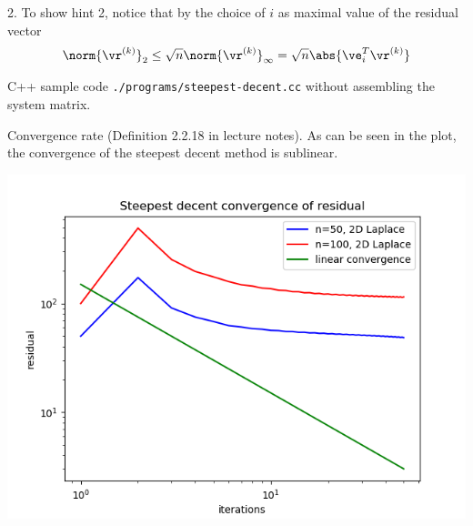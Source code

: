 \begin{SolutionSheet}[\ref{sheet8}]
\begin{Solution}
    2. To show hint 2, notice that by the choice of $i$ as maximal
    value of the residual vector
    \begin{align*}
      \norm{\vr^{(k)}}_2
      \leq \sqrt{n} \norm{\vr^{(k)}}_{\infty}
      = \sqrt{n} \abs{\ve_i^T\vr^{(k)}}
    \end{align*}

  \end{Solution}

  \begin{Solution}
  \end{Solution}

  \begin{Solution}[Programming]
    C++ sample code \lstinline{./programs/steepest-decent.cc} without
    assembling the system matrix.

    Convergence rate (Definition 2.2.18 in lecture notes).  As can be
    seen in the plot, the convergence of the steepest decent method is
    sublinear.

    \includegraphics[width=\textwidth]{figures/laplace-steepest-decent}
  \end{Solution}

\end{SolutionSheet}


